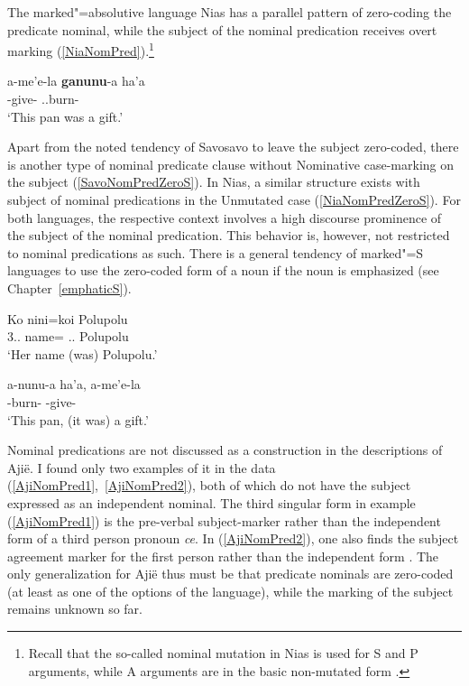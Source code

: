 The marked"=absolutive language Nias has a parallel pattern of zero-coding the predicate nominal, while the subject of the nominal predication receives overt marking (\ref{NiaNomPred}).\footnote{Recall that the so-called nominal mutation in Nias is used for S and P arguments, while A arguments are in the basic non-mutated form \citep{Brown:2001}.}  

\begin{exe}
\ex\label{NiaNomPred}
\gll a-me'e-la \textbf{ganunu}-a ha'a\\
\ipfv{}-give-\NR{} \ipfv{}.\mut{}.burn-\nmlz{} \prox{}\\
\glt `This pan was a gift.'
\end{exe}

Apart from the noted tendency of Savosavo to leave the subject zero-coded, there is another type of nominal predicate clause without Nominative case-mark\-ing on the subject (\ref{SavoNomPredZeroS}). 
In Nias, a similar structure exists with subject of nominal predications in the Unmutated case (\ref{NiaNomPredZeroS}). 
For both languages, the respective context involves a high discourse prominence of the subject of the nominal predication.  
This behavior is, however, not restricted to nominal predications as such. 
There is a general tendency of marked"=S languages to use the zero-coded form of a noun if the noun is emphasized (see Chapter~\ref{emphaticS}).

\begin{exe}\ex\label{SavoNomPredZeroS}
\gll Ko nini=koi Polupolu\\
3\sg{}.\fem{}.\gen{} name=\emphat{} \deter{}.\sg{}.\fem{} Polupolu\\
\glt `Her name (was) Polupolu.'
\end{exe}


\begin{exe}
\ex\label{NiaNomPredZeroS}
\gll a-nunu-a ha'a, a-me'e-la\\
\ipfv{}-burn-\nmlz{} \prox{} \ipfv{}-give-\nmlz{}\\
\glt `This pan, (it was) a gift.'
\end{exe}

Nominal predications are not discussed as a construction in the descriptions of Aji\"e. 
I found only two examples of it in the data (\ref{AjiNomPred1},~\ref{AjiNomPred2}), both of which do not have the subject expressed as an independent nominal.
The third singular form in example (\ref{AjiNomPred1}) is the pre-verbal subject-marker rather than the independent form of a third person pronoun \emph{ce}. 
In (\ref{AjiNomPred2}), one also finds the subject agreement marker for the first person rather than the independent form \emph{}.
The only generalization for Aji\"e thus must be that predicate nominals are zero-coded (at least as one of the options of the language), while the marking of the subject remains unknown so far.  



